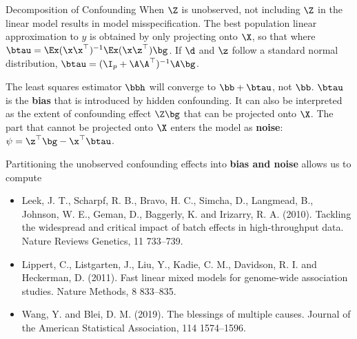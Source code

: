 \documentclass[final]{beamer}
\newlength{\colwidth}
\begin{document}
\begin{frame}[t]
\begin{columns}[t]
\begin{column}{\colwidth}
      \begin{block}{Decomposition of Confounding}
        When $\Z$ is unobserved, not including $\Z$ in the linear model results in model misspecification. The best population linear approximation to $y$ is obtained by only projecting onto $\X$, so that 
        where $\btau = \Ex(\x\x^\top)^{-1}\Ex(\x\z^\top)\bg$. If $\d$ and $\z$ follow a standard normal distribution, $\btau = (\I_p + \A\A^\top)^{-1}\A\bg$. 
        
        The least squares estimator $\bbh$ will converge to $\bb + \btau$, not $\bb$. $\btau$ is the \textbf{bias} that is introduced by hidden confounding. It can also be interpreted as the extent of confounding effect $\Z\bg$ that can be projected onto $\X$. The part that cannot be projected onto $\X$ enters the model as \textbf{noise}: $\psi=\z^\top\bg-\x^\top\btau$. 
        
        Partitioning the unobserved confounding effects into \textbf{bias and noise} allows us to compute 
      \end{block}

      \vspace{1mm} 

      \begin{block}

        \small{
          \begin{itemize}
          \item Leek, J. T., Scharpf, R. B., Bravo, H. C., Simcha, D., Langmead, B., Johnson, W. E., Geman, D., Baggerly, K. and Irizarry, R. A. (2010). Tackling the widespread and critical impact of batch effects in high-throughput data. Nature Reviews Genetics, 11 733–739.
          \item Lippert, C., Listgarten, J., Liu, Y., Kadie, C. M., Davidson, R. I. and Heckerman, D. (2011). Fast linear mixed models for genome-wide association studies. Nature Methods, 8 833–835.
          \item Wang, Y. and Blei, D. M. (2019). The blessings of multiple causes. Journal of the American Statistical Association, 114 1574–1596.
          \end{itemize}
        }


\end{block}
\end{column}
\end{columns}
\end{frame}
\end{document}
